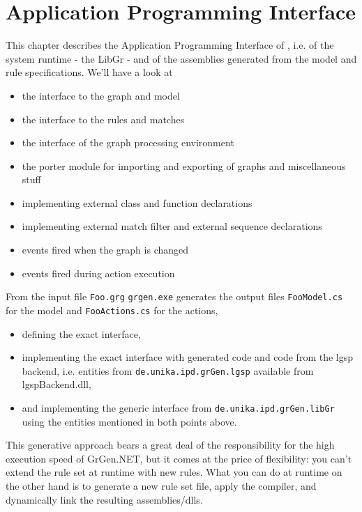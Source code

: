 \chapter{Application Programming Interface} 
\label{cha:api}

This chapter describes the Application Programming Interface of \GrG, i.e. of the system runtime - the LibGr - and of the assemblies generated from the model and rule specifications.
We'll have a look at
\begin{itemize}
\item the interface to the graph and model
\item the interface to the rules and matches
\item the interface of the graph processing environment
\item the porter module for importing and exporting of graphs and miscellaneous stuff
\item implementing external class and function declarations
\item implementing external match filter and external sequence declarations
\item events fired when the graph is changed
\item events fired during action execution
\end{itemize}

\noindent From the input file \texttt{Foo.grg} \texttt{grgen.exe} generates the output files \texttt{FooModel.cs} for the model and \texttt{FooActions.cs} for the actions,
\begin{itemize}
\item defining the exact interface, 
\item implementing the exact interface with generated code and code from the lgsp backend, i.e. entities from \texttt{de.unika.ipd.grGen.lgsp} available from lgspBackend.dll, 
\item and implementing the generic interface from \texttt{de.unika.ipd.grGen.libGr} using the entities mentioned in both points above.
\end{itemize}

\noindent This generative approach bears a great deal of the responsibility for the high execution speed of GrGen.NET, but it comes at the price of flexibility: you can't extend the rule set at runtime with new rules.
What you can do at runtime on the other hand is to generate a new rule set file, apply the compiler, and dynamically link the resulting assemblies/dlls.

